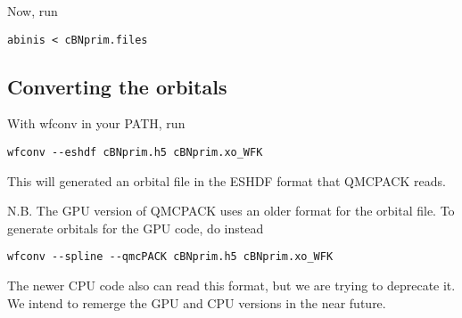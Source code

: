 Now, run
\begin{verbatim}
abinis < cBNprim.files
\end{verbatim}

\subsection*{Converting the orbitals}
With wfconv in your PATH, run
\begin{verbatim}
wfconv --eshdf cBNprim.h5 cBNprim.xo_WFK
\end{verbatim}

This will generated an orbital file in the ESHDF format that QMCPACK reads.

N.B. The GPU version of QMCPACK uses an older format for the orbital file. To generate orbitals for the GPU code, do instead
\begin{verbatim}
wfconv --spline --qmcPACK cBNprim.h5 cBNprim.xo_WFK
\end{verbatim}

The newer CPU code also can read this format, but we are trying to deprecate it. We intend to remerge the GPU and CPU versions in the near future. 

